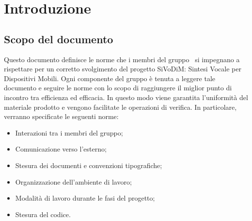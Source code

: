 \section{Introduzione}

\subsection{Scopo del documento}
Questo documento definisce le norme che i membri del gruppo \GRUPPO\ si impegnano a rispettare per un corretto svolgimento del progetto SiVoDiM: Sintesi Vocale per Dispositivi Mobili. Ogni componente del gruppo è tenuta a leggere tale documento e seguire le norme con lo scopo di raggiungere il miglior punto di incontro tra efficienza ed efficacia. In questo modo viene garantita l'uniformità del materiale prodotto e vengono facilitate le operazioni di verifica. In particolare, verranno specificate le seguenti norme:

\begin{itemize}
	\item	Interazioni tra i membri del gruppo;
	\item	Comunicazione verso l'esterno;
	\item	Stesura dei documenti e convenzioni tipografiche;
	\item	Organizzazione dell'ambiente di lavoro;
	\item	Modalità di lavoro durante le fasi del progetto;
	\item	Stesura del codice.
\end{itemize}

